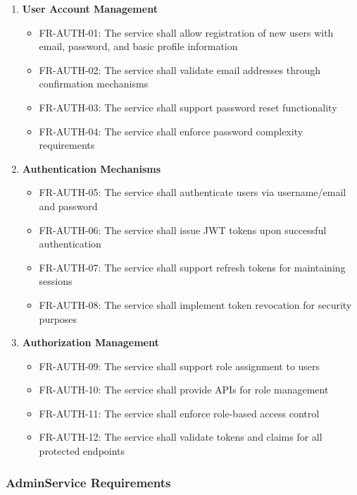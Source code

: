 \begin{enumerate}
   \item \textbf{User Account Management}
   \begin{itemize}
      \item FR-AUTH-01: The service shall allow registration of new users with email, password, and basic profile information
      \item FR-AUTH-02: The service shall validate email addresses through confirmation mechanisms
      \item FR-AUTH-03: The service shall support password reset functionality
      \item FR-AUTH-04: The service shall enforce password complexity requirements
   \end{itemize}

   \item \textbf{Authentication Mechanisms}
   \begin{itemize}
      \item FR-AUTH-05: The service shall authenticate users via username/email and password
      \item FR-AUTH-06: The service shall issue JWT tokens upon successful authentication
      \item FR-AUTH-07: The service shall support refresh tokens for maintaining sessions
      \item FR-AUTH-08: The service shall implement token revocation for security purposes
   \end{itemize}

   \item \textbf{Authorization Management}
   \begin{itemize}
      \item FR-AUTH-09: The service shall support role assignment to users
      \item FR-AUTH-10: The service shall provide APIs for role management
      \item FR-AUTH-11: The service shall enforce role-based access control
      \item FR-AUTH-12: The service shall validate tokens and claims for all protected endpoints
   \end{itemize}
\end{enumerate}

\subsubsection*{AdminService Requirements}


